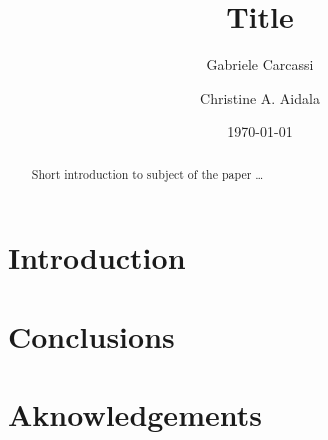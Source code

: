 \documentclass{article}
\title{Title}
\author[1]{Gabriele Carcassi}
\author[1]{Christine A. Aidala}
\affil[1]{
	Physics Department\\
	University of Michigan \\
	Ann Arbor, MI 48109
	}
\date{\today}
\begin{document}
\maketitle


\begin{abstract}
Short introduction to subject of the paper \ldots 
\end{abstract}

\section{Introduction}



\section{Conclusions}

\section*{Aknowledgements}



\end{document}
